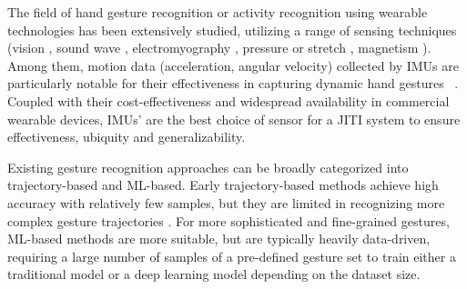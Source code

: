 The field of hand gesture recognition or activity recognition using wearable technologies has been extensively studied, utilizing a range of sensing techniques (\eg vision \cite{gong_wristwhirl_2016,kim_digits_2012,wu_back-hand-pose_2020,yeo_opisthenar_2019,hu_fingertrak_2020, nguyen2023hand, qi2024computer,xia2024ts2act}, sound wave \cite{nandakumar_fingerio_2016,laput_sensing_2019,harrison_skinput_2010,iravantchi_beamband_2019,iravantchi_interferi_2019, lee2024echowrist, li2023enabling}, electromyography \cite{saponas_enabling_2009,saponas_demonstrating_2008, meng2022user,chamberland2023novel}, pressure or stretch \cite{dementyev_wristflex_2014,jung_wearable_2015,strohmeier_flick_2012, si2022flexible, delpreto2022wearable}, magnetism \cite{chen_finexus_2016,chen_utrack_2013,parizi_auraring_2019,yang_magic_2012,kienzle_lightring_2014,sluyters2022hand,byberi2023glovesense}). 
Among them, motion data (\eg acceleration, angular velocity) collected by IMUs are particularly notable for their effectiveness in capturing dynamic hand gestures ~\cite{laput_viband_2016,wen_serendipity_2016,xu_finger-writing_2015,akl_novel_2011,kim_imu_2019, li2023signring,sharma2023sparseimu}. Coupled with their cost-effectiveness and widespread availability in commercial wearable devices, IMUs' are the best choice of sensor for a JITI system to ensure effectiveness, ubiquity and generalizability.

Existing gesture recognition approaches can be broadly categorized into trajectory-based and ML-based. 
Early trajectory-based methods \cite{liu_uwave_2009, mckenna_comparison_2004} achieve high accuracy with relatively few samples, but they are limited in recognizing more complex gesture trajectories \cite{mckenna_comparison_2004}. 
For more sophisticated and fine-grained gestures, ML-based methods are more suitable, but are typically heavily data-driven, requiring a large number of samples of a pre-defined gesture set to train either a traditional model \cite{georgi_recognizing_2015, iravantchi_beamband_2019,hu2020fine,chen2015utd} or a deep learning model \cite{hu_fingertrak_2020,yeo_opisthenar_2019,li2023signring,leng2024imugpt,shen2024mousering} depending on the dataset size. 


